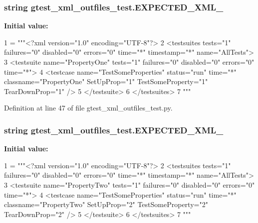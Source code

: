 \subsubsection[{\texorpdfstring{E\+X\+P\+E\+C\+T\+E\+D\+\_\+\+X\+M\+L\+\_\+1}{EXPECTED_XML_1}}]{\setlength{\rightskip}{0pt plus 5cm}string gtest\+\_\+xml\+\_\+outfiles\+\_\+test.\+E\+X\+P\+E\+C\+T\+E\+D\+\_\+\+X\+M\+L\+\_}\hypertarget{namespacegtest__xml__outfiles__test_a9d7b71e2d97dc7705cbe6e4882824c14}{}\label{namespacegtest__xml__outfiles__test_a9d7b71e2d97dc7705cbe6e4882824c14}
{\bfseries Initial value\+:}
\begin{DoxyCode}
1 = \textcolor{stringliteral}{"""<?xml version="1.0" encoding="UTF-8"?>}
2 \textcolor{stringliteral}{<testsuites tests="1" failures="0" disabled="0" errors="0" time="*" timestamp="*" name="AllTests">}
3 \textcolor{stringliteral}{  <testsuite name="PropertyOne" tests="1" failures="0" disabled="0" errors="0" time="*">}
4 \textcolor{stringliteral}{    <testcase name="TestSomeProperties" status="run" time="*" classname="PropertyOne" SetUpProp="1"
       TestSomeProperty="1" TearDownProp="1" />}
5 \textcolor{stringliteral}{  </testsuite>}
6 \textcolor{stringliteral}{</testsuites>}
7 \textcolor{stringliteral}{"""}
\end{DoxyCode}


Definition at line 47 of file gtest\+\_\+xml\+\_\+outfiles\+\_\+test.\+py.

\subsubsection[{\texorpdfstring{E\+X\+P\+E\+C\+T\+E\+D\+\_\+\+X\+M\+L\+\_\+2}{EXPECTED_XML_2}}]{\setlength{\rightskip}{0pt plus 5cm}string gtest\+\_\+xml\+\_\+outfiles\+\_\+test.\+E\+X\+P\+E\+C\+T\+E\+D\+\_\+\+X\+M\+L\+\_}\hypertarget{namespacegtest__xml__outfiles__test_a765455244a8cd7b3f32a51f0cda4157e}{}\label{namespacegtest__xml__outfiles__test_a765455244a8cd7b3f32a51f0cda4157e}
{\bfseries Initial value\+:}
\begin{DoxyCode}
1 = \textcolor{stringliteral}{"""<?xml version="1.0" encoding="UTF-8"?>}
2 \textcolor{stringliteral}{<testsuites tests="1" failures="0" disabled="0" errors="0" time="*" timestamp="*" name="AllTests">}
3 \textcolor{stringliteral}{  <testsuite name="PropertyTwo" tests="1" failures="0" disabled="0" errors="0" time="*">}
4 \textcolor{stringliteral}{    <testcase name="TestSomeProperties" status="run" time="*" classname="PropertyTwo" SetUpProp="2"
       TestSomeProperty="2" TearDownProp="2" />}
5 \textcolor{stringliteral}{  </testsuite>}
6 \textcolor{stringliteral}{</testsuites>}
7 \textcolor{stringliteral}{"""}
\end{DoxyCode}


